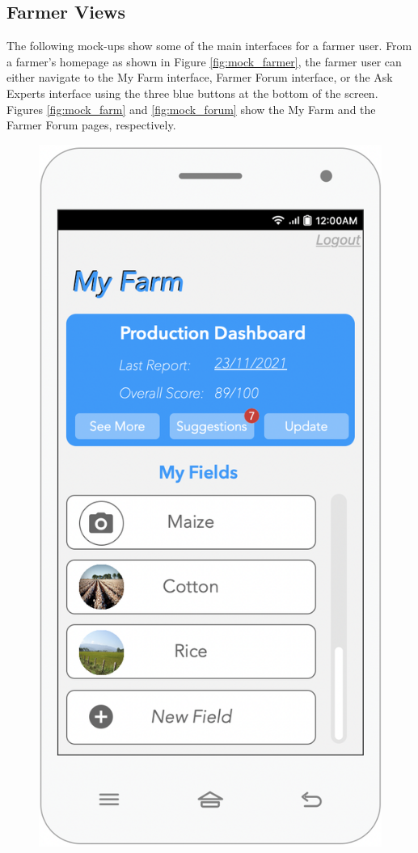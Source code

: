 \newpage
\subsection{Farmer Views}
\begin{flushleft}
The following mock-ups show some of the main interfaces for a farmer user. From a farmer's homepage as shown in Figure \ref{fig:mock_farmer}, the farmer user can either navigate to the My Farm interface, Farmer Forum interface, or the Ask Experts interface using the three blue buttons at the bottom of the screen. Figures \ref{fig:mock_farm} and \ref{fig:mock_forum} show the My Farm and the Farmer Forum pages, respectively. 
\end{flushleft}

\begin{multicols}{2}
\begin{figure}[H]
\centering
\includegraphics[scale=0.5]{../images_diagrams/mock_ups/myfarm100.png}

\end{figure}
\end{multicols}
